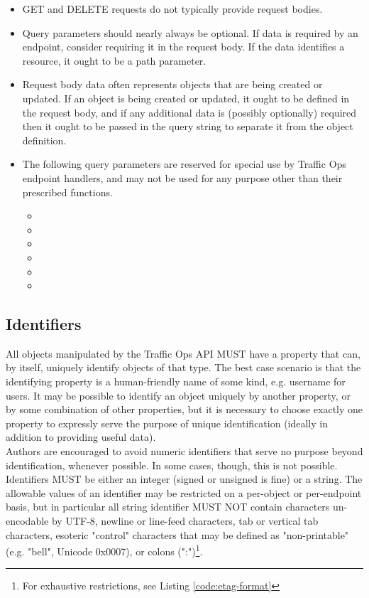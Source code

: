 \begin{itemize}
	\item GET and DELETE requests do not typically provide request bodies.
	\item Query parameters should nearly always be optional. If data is required by an endpoint, consider requiring it in the request body. If the data identifies a resource, it ought to be a path parameter.
	\item Request body data often represents objects that are being created or updated. If an object is being created or updated, it ought to be defined in the
	request body, and if any additional data is (possibly optionally) required then it ought to be passed in the query string to separate it from the object definition.
	\item The following query parameters are reserved for special use by Traffic Ops endpoint handlers, and may not be used for any purpose other
	than their prescribed functions.
	\begin{itemize}
		\item {}
		\item {}
		\item {}
		\item {}
		\item {}
		\item {}
	\end{itemize}
\end{itemize}

\subsection{Identifiers}
All objects manipulated by the Traffic Ops API MUST have a property that can, by itself, uniquely identify objects of that type. The best case
scenario is that the identifying property is a human-friendly name of some kind, e.g. username for users. It may be possible to identify an
object uniquely by another property, or by some combination of other properties, but it is necessary to choose exactly one property to expressly
serve the purpose of unique identification (ideally in addition to providing useful data).\\
Authors are encouraged to avoid numeric identifiers that serve no purpose beyond identification, whenever possible. In some cases, though, this
is not possible.\\
Identifiers MUST be either an integer (signed or unsigned is fine) or a string.
The allowable values of an identifier may be restricted on a per-object or
per-endpoint basis, but in particular all string identifier MUST NOT contain
characters un-encodable by UTF-8, newline or line-feed characters, tab or
vertical tab characters, esoteric "control" characters that may be defined as
"non-printable" (e.g. "bell", Unicode 0x0007), or colons (":")\footnote{For
exhaustive restrictions, see Listing \ref{code:etag-format}}.

